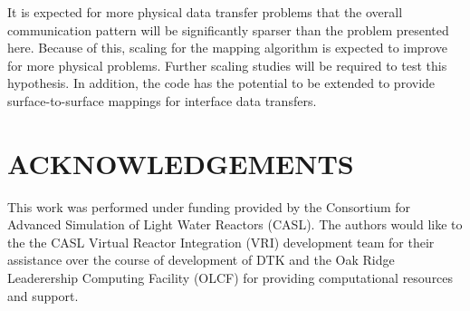\documentclass{mc2013}
\begin{document}
It is expected for more physical data transfer problems that the
overall communication pattern will be significantly sparser than the
problem presented here. Because of this, scaling for the mapping
algorithm is expected to improve for more physical problems. Further
scaling studies will be required to test this hypothesis. In addition,
the code has the potential to be extended to provide
surface-to-surface mappings for interface data transfers.


\section*{ACKNOWLEDGEMENTS}

This work was performed under funding provided by the Consortium for
Advanced Simulation of Light Water Reactors (CASL). The authors would
like to the the CASL Virtual Reactor Integration (VRI) development
team for their assistance over the course of development of DTK and
the Oak Ridge Leaderership Computing Facility (OLCF) for providing
computational resources and support.

\setlength{\baselineskip}{12pt}


\end{document}
